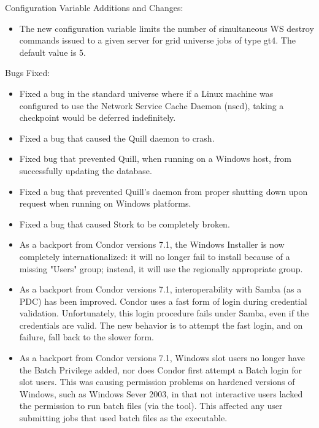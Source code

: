 \noindent Configuration Variable Additions and Changes:

\begin{itemize}

\item The new configuration variable
 limits the number
of simultaneous WS destroy commands issued to a given server for grid
universe jobs of type gt4. The default value is 5.

\end{itemize}

\noindent Bugs Fixed:

\begin{itemize}

\item Fixed a bug in the standard universe where if a Linux machine was
  configured to use the Network Service Cache Daemon (nscd), taking
  a checkpoint would be deferred indefinitely.

\item Fixed a bug that caused the Quill daemon to crash.

\item Fixed bug that prevented Quill, when running on a
  Windows host, from successfully updating the database.

\item Fixed a bug that prevented Quill's  daemon from proper
  shutting down upon request when running on Windows platforms.

\item Fixed a bug that caused Stork to be completely broken.

\item As a backport from Condor versions 7.1,
  the Windows Installer is now completely
  internationalized: it will no longer fail to install because of a
  missing "Users" group; instead, it will use the regionally appropriate
  group.

\item As a backport from Condor versions 7.1,
  interoperability with Samba (as a PDC) has been improved.
  Condor uses a fast form of login during credential validation.
  Unfortunately, this login procedure fails under Samba,
  even if the credentials are valid.  The new behavior is to attempt
  the fast login, and on failure, fall back to the slower form.

\item As a backport from Condor versions 7.1,
  Windows slot users no longer have the
  Batch Privilege added, nor does Condor first attempt a Batch login
  for slot users.  This was causing permission problems on hardened
  versions of Windows, such as Windows Sever 2003, in that not
  interactive users lacked the permission to run batch files 
  (via the  tool). 
  This affected any user submitting jobs that used
  batch files as the executable.


\end{itemize}
